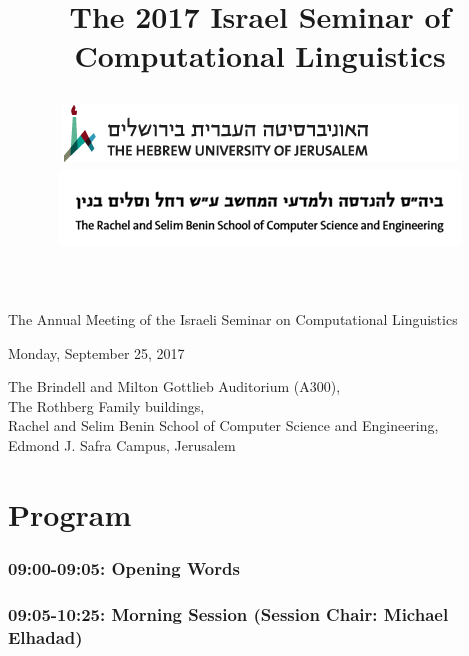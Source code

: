 \documentclass[a0,portrait]{a0poster}
\makeatletter
\renewcommand{\maketitle}{\bgroup\setlength{\parindent}{0pt}
\begin{flushleft}
    \VeryHuge{\@title}
\end{flushleft}\egroup
}
\makeatother
\begin{document}
    \title{
    \begin{minipage}{.5\textwidth}
        The 2017 Israel Seminar of Computational Linguistics
    \end{minipage}
    \hfill
    \begin{minipage}{.4\textwidth}
        \includegraphics[width=\textwidth]{huji_banner.png}
        \includegraphics[width=\textwidth]{cse_banner.png}
    \end{minipage}
    }
    \maketitle


    The Annual Meeting of the Israeli Seminar on Computational Linguistics

    Monday, September 25, 2017

    The Brindell and Milton Gottlieb Auditorium (A300),\\
    The Rothberg Family buildings,\\
    Rachel and Selim Benin School of Computer Science and Engineering,\\
    Edmond J. Safra Campus, Jerusalem

    \part*{Program}

    \section*{09:00-09:05: Opening Words}

    \section*{09:05-10:25: Morning Session (Session Chair: Michael Elhadad)}
\end{document}
